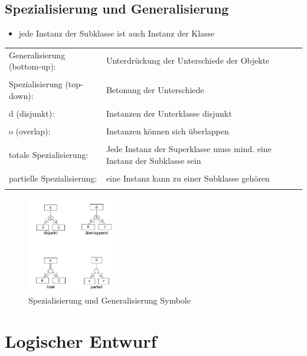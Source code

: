 \documentclass[a4paper]{article}
\begin{document}
\subsection{Spezialisierung und Generalisierung}
\begin{itemize}
    \item jede Instanz der Subklasse ist auch Instanz der Klasse
\end{itemize}
\begin{tabular}{l p{10cm}}
    Generalisierung (bottom-up): &  Unterdrückung der Unterschiede der Objekte \\
    & \\
    Spezialisierung (top-down): & Betonung der Unterschiede \\
    & \\
    d (disjunkt): & Instanzen der Unterklasse disjunkt \\
    & \\
    o (overlap): & Instanzen können sich überlappen \\
    & \\
    totale Spezialisierung: & Jede Instanz der Superklasse muss mind. eine Instanz der Subklasse sein \\
    & \\
    partielle Spezialisierung: & eine Instanz kann zu einer Subklasse gehören \\
    & \\
\end{tabular}

\begin{figure}[htp]
    \centering
    \includegraphics[width=4cm]{images/SpezialisierungGeneralisierung.png}
    \caption{Spezialisierung und Generalisierung Symbole}
    \label{fig:SpezialisierungGeneralisierung}
\end{figure}

\vspace{5mm}

\section{Logischer Entwurf}
\end{document}
